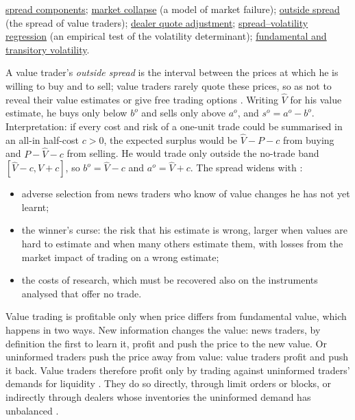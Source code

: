 \begin{qfresult}
 \hyperref[res:adverse-selection-spread-component]{spread components}; \hyperref[res:glosten-milgrom-market-collapse]{market collapse} (a model of market failure); \hyperref[def:outside-spread]{outside spread} (the spread of value traders); \hyperref[meth:dealer-quote-adjustment]{dealer quote adjustment}; \hyperref[meth:spread-volatility-regression]{spread--volatility regression} (an empirical test of the volatility determinant); \hyperref[def:volatility-components]{fundamental and transitory volatility}.

\end{qfresult}

\begin{qfdefinition}\label{def:outside-spread}
 A value trader's \emph{outside spread} is the interval between the prices at which he is willing to buy and to sell; value traders rarely quote these prices, so as not to reveal their value estimates or give free trading options \citep[chap.~``Value Traders'', sec.~16.2, p.~340]{alpha-harris}. Writing $\widehat V$ for his value estimate, he buys only below $b^o$ and sells only above $a^o$, and $s^o=a^o-b^o$. Interpretation: if every cost and risk of a one-unit trade could be summarised in an all-in half-cost $c>0$, the expected surplus would be $\widehat V-P-c$ from buying and $P-\widehat V-c$ from selling. He would trade only outside the no-trade band $[\widehat V-c,\widehat V+c]$, so $b^o=\widehat V-c$ and $a^o=\widehat V+c$. The spread widens with \citep[same chap., pp.~340--344]{alpha-harris}:
\begin{itemize}
\item adverse selection from news traders who know of value changes he has not yet learnt;
\item the winner's curse: the risk that his estimate is wrong, larger when values are hard to estimate and when many others estimate them, with losses from the market impact of trading on a wrong estimate;
\item the costs of research, which must be recovered also on the instruments analysed that offer no trade.
\end{itemize}

 Value trading is profitable only when price differs from fundamental value, which happens in two ways. New information changes the value: news traders, by definition the first to learn it, profit and push the price to the new value. Or uninformed traders push the price away from value: value traders profit and push it back. Value traders therefore profit only by trading against uninformed traders' demands for liquidity \citep[same chap., sec.~16.1, pp.~338--339]{alpha-harris}. They do so directly, through limit orders or blocks, or indirectly through dealers whose inventories the uninformed demand has unbalanced \citep[same chap., secs.~16.1.1--16.1.2, pp.~339--340]{alpha-harris}.


\end{qfdefinition}
